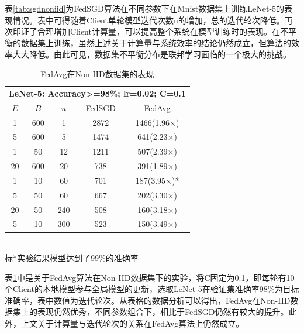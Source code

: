\documentclass[zihao = -4,cn]{oucart}
\begin{document}
\par
表\ref{tab:sgdnoniid}为FedSGD算法在不同参数下在Mnist数据集上训练LeNet-5的表现情况。表中可得随着Client单轮模型迭代次数u的增加，总的迭代轮次降低。再次印证了合理增加Client计算量，可以提高整个系统在模型训练时的表现。在不平衡的数据集上训练，虽然上述关于计算量与系统效率的结论仍然成立，但算法的效率大大降低。由此可见，数据集不平衡分布是联邦学习面临的一个极大的挑战。

\begin{table}[!htbp]
\caption{\label{tab:avgnoniid}FedAvg在Non-IID数据集的表现}
\begin{center}
\begin{tabular}{ccccc}
\toprule
\multicolumn{5}{c}{\textbf{LeNet-5: Accuracy>=98\%; lr=0.02; C=0.1}} \\
$E$ & $B$ & $u$ & FedSGD & FedAvg \\
\midrule
1  & 600 & 1   & 2872  & 1466(1.96$\times$) \\
5  & 600 & 5   & 1474  & 641(2.23$\times$)  \\
1  & 50  & 12  & 1211  & 507(2.39$\times$)  \\
20 & 600 & 20  & 738   & 391(1.89$\times$) \\
1  & 10  & 60  & 701   & 187(3.95$\times$)* \\
5  & 50  & 60  & 667   & 202(3.30$\times$)\\
20 & 50  & 240 & 508   & 160(3.18$\times$) \\
5  & 10  & 300 & 523   & 150(3.49$\times$) \\
\bottomrule
\end{tabular}
\footnotesize\\
标*实验结果模型达到了99\%的准确率
\end{center}
\end{table}

表\ref{tab:avgnoniid}中是关于FedAvg算法在Non-IID数据集下的实验，将C固定为0.1，即每轮有10个Client的本地模型参与全局模型的更新，选取LeNet-5在验证集准确率98\%为目标准确率，表中数值为迭代轮次。从表格的数据分析可以得出，FedAvg在Non-IID数据集上的表现仍然优秀，不同参数组合下，相比于FedSGD仍然有较大的提升。此外，上文关于计算量与迭代轮次的关系在FedAvg算法上仍然成立。
\end{document}
